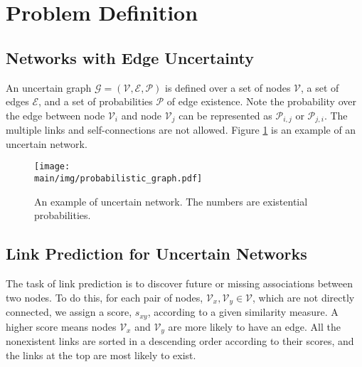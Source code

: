 \documentclass[\main/thesis.tex]{subfiles}
\begin{document}


\section{Problem Definition}
\subsection{Networks with Edge Uncertainty} \label{Uncertain-Network-Definition}
An uncertain graph $\mathcal{G = (V,E,P)}$ is defined over a set of nodes $\mathcal{V}$, a set of edges $\mathcal{E}$, and a set of probabilities $\mathcal{P}$ of edge existence. Note the probability over the edge between node $\mathcal{V}_i$ and node $\mathcal{V}_j$ can be represented as $\mathcal{P}_{i,j}$ or $\mathcal{P}_{j,i}$. The multiple links and self-connections are not allowed. Figure \ref{uncertain_network_example} is an example of an uncertain network.
\begin{figure}
\centering
\texttt{[image: \\main/img/probabilistic\_graph.pdf]}
\caption{An example of uncertain network. The numbers are existential probabilities.}
\label{uncertain_network_example}
\end{figure}

\subsection{Link Prediction for Uncertain Networks}
The task of link prediction is to discover future or missing associations between two nodes. To do this, for each pair of nodes, $\mathcal{V}_x,\mathcal{V}_y\in \mathcal{V}$, which are not directly connected, we assign a score, $s_{xy}$, according to a given similarity measure. A higher score means nodes $\mathcal{V}_x$ and $\mathcal{V}_y$ are more likely to have an edge. All the nonexistent links are sorted in a descending order according to their scores, and the links at the top are most likely to exist.
\end{document}
